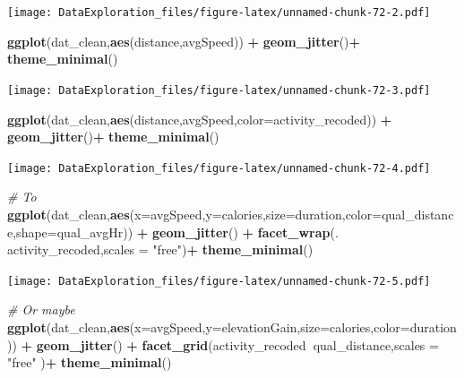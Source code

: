 \documentclass[
]{book}
\newenvironment{Shaded}{\begin{snugshade}}{\end{snugshade}}
\newcommand{\CommentTok}[1]{\textcolor[rgb]{0.56,0.35,0.01}{\textit{#1}}}
\newcommand{\DataTypeTok}[1]{\textcolor[rgb]{0.13,0.29,0.53}{#1}}
\newcommand{\KeywordTok}[1]{\textcolor[rgb]{0.13,0.29,0.53}{\textbf{#1}}}
\newcommand{\NormalTok}[1]{#1}
\newcommand{\OperatorTok}[1]{\textcolor[rgb]{0.81,0.36,0.00}{\textbf{#1}}}
\newcommand{\StringTok}[1]{\textcolor[rgb]{0.31,0.60,0.02}{#1}}
\begin{document}
\texttt{[image: DataExploration\_files/figure-latex/unnamed-chunk-72-2.pdf]}

\begin{Shaded}
\begin{Highlighting}[]
\KeywordTok{ggplot}\NormalTok{(dat_clean,}\KeywordTok{aes}\NormalTok{(distance,avgSpeed)) }\OperatorTok{+}\StringTok{ }\KeywordTok{geom_jitter}\NormalTok{()}\OperatorTok{+}
\StringTok{  }\KeywordTok{theme_minimal}\NormalTok{()}
\end{Highlighting}
\end{Shaded}

\texttt{[image: DataExploration\_files/figure-latex/unnamed-chunk-72-3.pdf]}

\begin{Shaded}
\begin{Highlighting}[]
\KeywordTok{ggplot}\NormalTok{(dat_clean,}\KeywordTok{aes}\NormalTok{(distance,avgSpeed,}\DataTypeTok{color=}\NormalTok{activity_recoded))  }\OperatorTok{+}\StringTok{ }\KeywordTok{geom_jitter}\NormalTok{()}\OperatorTok{+}
\StringTok{  }\KeywordTok{theme_minimal}\NormalTok{()}
\end{Highlighting}
\end{Shaded}

\texttt{[image: DataExploration\_files/figure-latex/unnamed-chunk-72-4.pdf]}

\begin{Shaded}
\begin{Highlighting}[]
\CommentTok{# To }
\KeywordTok{ggplot}\NormalTok{(dat_clean,}\KeywordTok{aes}\NormalTok{(}\DataTypeTok{x=}\NormalTok{avgSpeed,}\DataTypeTok{y=}\NormalTok{calories,}\DataTypeTok{size=}\NormalTok{duration,}\DataTypeTok{color=}\NormalTok{qual_distance,}\DataTypeTok{shape=}\NormalTok{qual_avgHr)) }\OperatorTok{+}\StringTok{ }
\StringTok{  }\KeywordTok{geom_jitter}\NormalTok{() }\OperatorTok{+}\StringTok{ }
\StringTok{  }\KeywordTok{facet_wrap}\NormalTok{(.}\OperatorTok{~}\StringTok{ }\NormalTok{activity_recoded,}\DataTypeTok{scales =} \StringTok{"free"}\NormalTok{)}\OperatorTok{+}
\StringTok{  }\KeywordTok{theme_minimal}\NormalTok{()}
\end{Highlighting}
\end{Shaded}

\texttt{[image: DataExploration\_files/figure-latex/unnamed-chunk-72-5.pdf]}

\begin{Shaded}
\begin{Highlighting}[]
\CommentTok{# Or maybe}
\KeywordTok{ggplot}\NormalTok{(dat_clean,}\KeywordTok{aes}\NormalTok{(}\DataTypeTok{x=}\NormalTok{avgSpeed,}\DataTypeTok{y=}\NormalTok{elevationGain,}\DataTypeTok{size=}\NormalTok{calories,}\DataTypeTok{color=}\NormalTok{duration)) }\OperatorTok{+}\StringTok{ }
\StringTok{  }\KeywordTok{geom_jitter}\NormalTok{() }\OperatorTok{+}\StringTok{ }
\StringTok{  }\KeywordTok{facet_grid}\NormalTok{(activity_recoded}\OperatorTok{~}\NormalTok{qual_distance,}\DataTypeTok{scales =} \StringTok{"free"}\NormalTok{ )}\OperatorTok{+}
\StringTok{  }\KeywordTok{theme_minimal}\NormalTok{()}
\end{Highlighting}
\end{Shaded}
\end{document}
